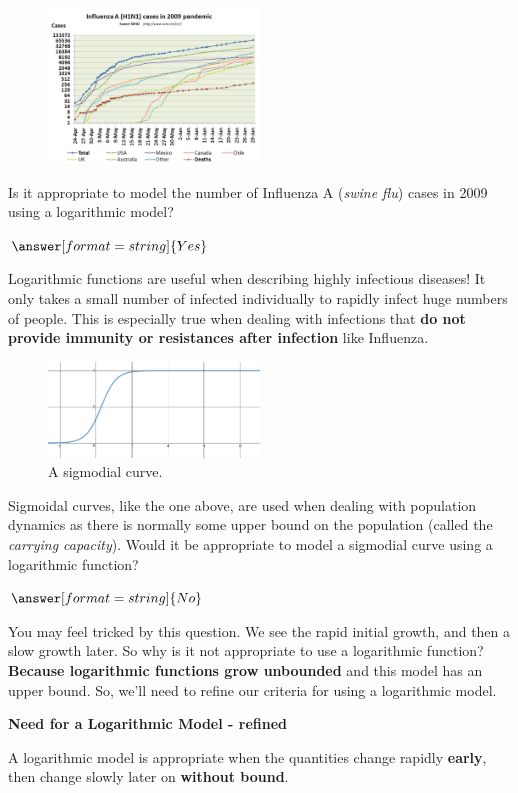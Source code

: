 \documentclass{ximera}
\begin{document}
\begin{question}
\begin{figure}
	\includegraphics[width=0.5\textwidth]{Influenza-2009.png}
\end{figure}

Is it appropriate to model the number of Influenza A (\textit{swine flu}) cases in 2009 using a logarithmic model? 

$\answer[format=string]{Yes}$

\begin{feedback}
Logarithmic functions are useful when describing highly infectious diseases! It only takes a small number of infected individually to rapidly infect huge numbers of people. This is especially true when dealing with infections that \textbf{do not provide immunity or resistances after infection} like Influenza. 
\end{feedback}

\end{question}

\begin{question}

\begin{figure}
	\includegraphics[width=0.5\textwidth]{logarithmicGrowth.png}
	\caption{A sigmodial curve.}
\end{figure}

Sigmoidal curves, like the one above, are used when dealing with population dynamics as there is normally some upper bound on the population (called the \textit{carrying capacity}). Would it be appropriate to model a sigmodial curve using a logarithmic function?

$\answer[format=string]{No}$

\begin{feedback}
You may feel tricked by this question. We see the rapid initial growth, and then a slow growth later. So why is it not appropriate to use a logarithmic function? \textbf{Because logarithmic functions grow unbounded} and this model has an upper bound. So, we'll need to refine our criteria for using a logarithmic model.
\end{feedback}
\end{question}

\begin{theorem}
	\textbf{Need for a Logarithmic Model - refined}
	
	A logarithmic model is appropriate when the quantities change rapidly \textbf{early}, then change slowly later on \textbf{without bound}. 	
\end{theorem}
\end{document}
